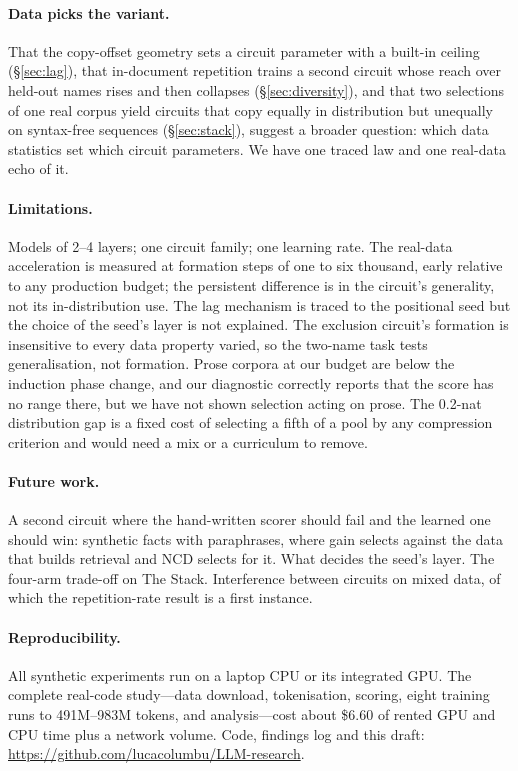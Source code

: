 \documentclass[11pt]{article}
\newcommand{\ncd}{\mathrm{NCD}}
\begin{document}
\paragraph{Data picks the variant.}
That the copy-offset geometry sets a circuit parameter with a built-in
ceiling (\S\ref{sec:lag}), that in-document repetition trains a second
circuit whose reach over held-out names rises and then collapses
(\S\ref{sec:diversity}), and that two selections of one real corpus yield
circuits that copy equally in distribution but unequally on syntax-free
sequences (\S\ref{sec:stack}), suggest a broader question: which data
statistics set which circuit parameters. We have one traced law and one
real-data echo of it.

\paragraph{Limitations.}
Models of 2--4 layers; one circuit family; one learning rate. The
real-data acceleration is measured at formation steps of one to six
thousand, early relative to any production budget; the persistent
difference is in the circuit's generality, not its in-distribution use.
The lag mechanism is traced to the positional seed but the choice of the
seed's layer is not explained. The exclusion circuit's formation is
insensitive to every data property varied, so the two-name task tests
generalisation, not formation. Prose corpora at our budget are below the
induction phase change, and our diagnostic correctly reports that the
score has no range there, but we have not shown selection acting on prose.
The 0.2-nat distribution gap is a fixed cost of selecting a fifth of a pool
by any compression criterion and would need a mix or a curriculum to
remove.

\paragraph{Future work.}
A second circuit where the hand-written scorer should fail and the learned
one should win: synthetic facts with paraphrases, where gain selects
against the data that builds retrieval and $\ncd$ selects for it. What
decides the seed's layer. The four-arm trade-off on The Stack.
Interference between circuits on mixed data, of which the repetition-rate
result is a first instance.

\paragraph{Reproducibility.}
All synthetic experiments run on a laptop CPU or its integrated GPU. The
complete real-code study---data download, tokenisation, scoring, eight
training runs to 491M--983M tokens, and analysis---cost about \$6.60 of
rented GPU and CPU time plus a network volume. Code, findings log and this draft: \url{https://github.com/lucacolumbu/LLM-research}.
\end{document}
